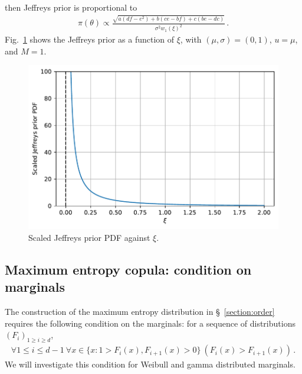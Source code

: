 \documentclass{article}
\begin{document}
%
then Jeffreys prior is proportional to
%
\begin{align*}
	\pi(\theta) \propto
	 \frac{\sqrt{a(df-e^2) + b(ce-bf) + c(be-dc)}}
		{\sigma^2 w_1(\xi)^2} \,.
\end{align*}
%
Fig.~\ref{fig:jeffreys} shows the Jeffreys prior as a function of $\xi$,
with $(\mu, \sigma) = (0,  1)$, $u = \mu$, and $M = 1$.
%
\begin{figure}
	\centering
	\includegraphics[width=0.7\linewidth]{plots/jeffreys.pdf}
	\caption{Scaled Jeffreys prior PDF against $\xi$.}
	\label{fig:jeffreys}
\end{figure}
%
\subsection{Maximum entropy copula: condition on marginals}
\label{appendix:C2}
%

%
The construction of the maximum entropy distribution in
\S~\ref{section:order} requires the following condition on the marginals:
for a sequence of distributions $(F_i)_{1 \geq i \geq d}$,
%
\begin{align}
	\forall 1 \leq i \leq d - 1
		\ \forall x \in \{x \colon 1 > F_i(x), F_{i + 1}(x) > 0\}
		\ (F_i(x) > F_{i + 1}(x))\,.
	\label{eq:C2-2}
\end{align}
%
We will investigate this condition for
Weibull and gamma distributed marginals.
%
\end{document}
